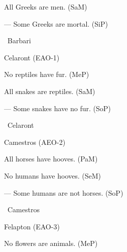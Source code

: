 \begin{isabellebody}
\begin{exercise}[subtitle=Silogizmi]
\begin{isamarkuptext}
All Greeks are men. (SaM)%
\end{isamarkuptext}\isamarkuptrue%
%
\begin{isamarkuptext}%
— Some Greeks are mortal. (SiP)%
\end{isamarkuptext}\isamarkuptrue%
\isamarkupfalse%
\ Barbari{\isacharcolon}{\kern0pt}\ %
\isadelimproof
%
\endisadelimproof
%
\isatagproof
%
\endisatagproof
{\isafoldproof}%
%
\isadelimproof
%
\endisadelimproof
%
\begin{isamarkuptext}%
Celaront (EAO-1)%
\end{isamarkuptext}\isamarkuptrue%
%
\begin{isamarkuptext}%
No reptiles have fur. (MeP)%
\end{isamarkuptext}\isamarkuptrue%
%
\begin{isamarkuptext}%
All snakes are reptiles. (SaM)%
\end{isamarkuptext}\isamarkuptrue%
%
\begin{isamarkuptext}%
— Some snakes have no fur. (SoP)%
\end{isamarkuptext}\isamarkuptrue%
\isamarkupfalse%
\ Celaront{\isacharcolon}{\kern0pt}%
\isadelimproof
%
\endisadelimproof
%
\isatagproof
%
\endisatagproof
{\isafoldproof}%
%
\isadelimproof
%
\endisadelimproof
%
\begin{isamarkuptext}%
Camestros (AEO-2)%
\end{isamarkuptext}\isamarkuptrue%
%
\begin{isamarkuptext}%
All horses have hooves. (PaM)%
\end{isamarkuptext}\isamarkuptrue%
%
\begin{isamarkuptext}%
No humans have hooves. (SeM)%
\end{isamarkuptext}\isamarkuptrue%
%
\begin{isamarkuptext}%
— Some humans are not horses. (SoP)%
\end{isamarkuptext}\isamarkuptrue%
\isamarkupfalse%
\ Camestros{\isacharcolon}{\kern0pt}%
\isadelimproof
%
\endisadelimproof
%
\isatagproof
%
\endisatagproof
{\isafoldproof}%
%
\isadelimproof
%
\endisadelimproof
%
\begin{isamarkuptext}%
Felapton (EAO-3)%
\end{isamarkuptext}\isamarkuptrue%
%
\begin{isamarkuptext}%
No flowers are animals. (MeP)%
\end{isamarkuptext}\isamarkuptrue%
%
\begin{isamarkuptext}%

\end{isamarkuptext}
\end{exercise}
\end{isabellebody}
